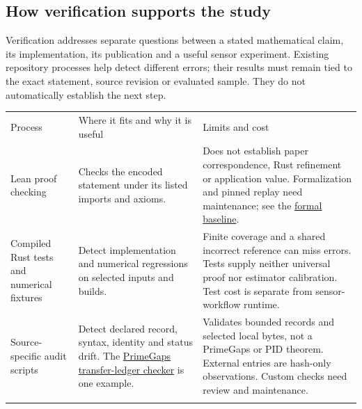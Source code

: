 \documentclass[11pt,a4paper]{article}
\newcounter{none}
\begin{document}
\par{}

\subsection{How verification supports the study}\label{how-verification-supports-the-study}

Verification addresses separate questions between a stated mathematical claim, its implementation, its publication and a useful sensor experiment. Existing repository processes help detect different errors; their results must remain tied to the exact statement, source revision or evaluated sample. They do not automatically establish the next step.

{\def\LTcaptype{none} %
\begin{longtable}[]{@{}
  >{\raggedright\arraybackslash}p{}
  >{\raggedright\arraybackslash}p{}
  >{\raggedright\arraybackslash}p{}@{}}
\toprule\noalign{}
\begin{minipage}[b]{\linewidth}\raggedright
Process
\end{minipage} & \begin{minipage}[b]{\linewidth}\raggedright
Where it fits and why it is useful
\end{minipage} & \begin{minipage}[b]{\linewidth}\raggedright
Limits and cost
\end{minipage} \\*
\midrule\noalign{}
\endhead
\bottomrule\noalign{}
\endfoot
Lean proof checking & Checks the encoded statement under its listed imports and axioms. & Does not establish paper correspondence, Rust refinement or application value. Formalization and pinned replay need maintenance; see the \href{https://github.com/sepahead/pid-rs/blob/main/audit/formal/LEAN_4_33_FREEZE_AND_REPLAY.md}{formal baseline}. \\*
Compiled Rust tests and numerical fixtures & Detect implementation and numerical regressions on selected inputs and builds. & Finite coverage and a shared incorrect reference can miss errors. Tests supply neither universal proof nor estimator calibration. Test cost is separate from sensor-workflow runtime. \\*
Source-specific audit scripts & Detect declared record, syntax, identity and status drift. The \href{https://github.com/sepahead/pid-rs/blob/main/scripts/check-primegaps-to-pid-transfer-ledger.py}{PrimeGaps transfer-ledger checker} is one example. & Validates bounded records and selected local bytes, not a PrimeGaps or PID theorem. External entries are hash-only observations. Custom checks need review and maintenance. \\*

\end{longtable}}
\end{document}
